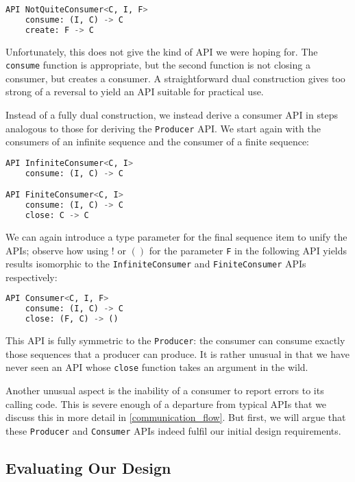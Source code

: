 \documentclass[sigplan,screen,10pt,anonymous,review]{acmart}
\begin{document}
\begin{lstlisting}[language=Python]
API NotQuiteConsumer<C, I, F>
    consume: (I, C) -> C
    create: F -> C
\end{lstlisting}

Unfortunately, this does not give the kind of API we were hoping for. The \texttt{consume} function is appropriate, but the second function is not closing a consumer, but creates a consumer. A straightforward dual construction gives too strong of a reversal to yield an API suitable for practical use.

Instead of a fully dual construction, we instead derive a consumer API in steps analogous to those for deriving the \texttt{Producer} API. We start again with the consumers of an infinite sequence and the consumer of a finite sequence:

\begin{lstlisting}[language=Python]
API InfiniteConsumer<C, I>
    consume: (I, C) -> C

API FiniteConsumer<C, I>
    consume: (I, C) -> C
    close: C -> C
\end{lstlisting}

We can again introduce a type parameter for the final sequence item to unify the APIs; observe how using $!$ or $()$ for the parameter \texttt{F} in the following API yields results isomorphic to the \texttt{InfiniteConsumer} and \texttt{FiniteConsumer} APIs respectively:

\begin{lstlisting}[language=Python]
API Consumer<C, I, F>
    consume: (I, C) -> C
    close: (F, C) -> ()
\end{lstlisting}

This API is fully symmetric to the \texttt{Producer}: the consumer can consume exactly those sequences that a producer can produce. It is rather unusual in that we have never seen an API whose \texttt{close} function takes an argument in the wild.

Another unusual aspect is the inability of a consumer to report errors to its calling code. This is severe enough of a departure from typical APIs that we discuss this in more detail in \cref{communication_flow}. But first, we will argue that these \texttt{Producer} and \texttt{Consumer} APIs indeed fulfil our initial design requirements.

\subsection{Evaluating Our Design}\label{evaluating_ours}
\end{document}
